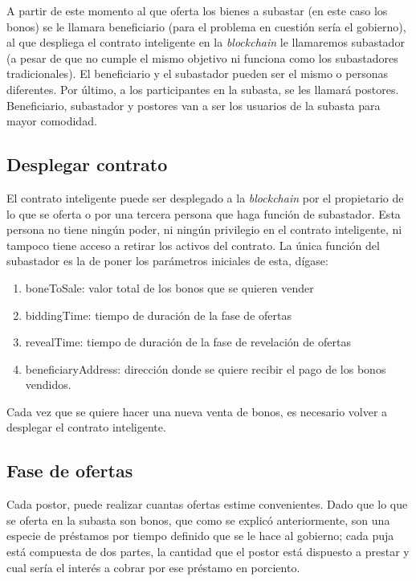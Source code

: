   A partir de este momento al que oferta los bienes a subastar (en este caso los bonos) se le llamara 
  beneficiario (para el problema en cuestión sería el gobierno), al que despliega el contrato inteligente en la \textit{blockchain} le llamaremos 
  subastador (a pesar de que no cumple el mismo objetivo ni funciona como los subastadores tradicionales). El beneficiario y el 
  subastador pueden ser el mismo o personas diferentes. Por último, a los participantes en la subasta, se les llamará postores. 
  Beneficiario, subastador y postores van a ser los usuarios de la subasta para mayor comodidad.

  \subsection{Desplegar contrato}
    El contrato inteligente puede ser desplegado a la \textit{blockchain} por el propietario de lo que se oferta
    o por una tercera persona que haga función de subastador. Esta persona no tiene ningún poder, ni ningún
    privilegio en el contrato inteligente, ni tampoco tiene acceso a retirar los activos del contrato. La única función del subastador 
    es la de poner los parámetros iniciales de esta, dígase: 
  
    \begin{enumerate}
      \item boneToSale: valor total de los bonos que se quieren vender
      \item biddingTime: tiempo de duración de la fase de ofertas
      \item revealTime: tiempo de duración de la fase de revelación de ofertas
      \item beneficiaryAddress: dirección donde se quiere recibir el pago de los bonos vendidos.
    \end{enumerate}

    Cada vez que se quiere hacer una nueva venta de bonos, es necesario volver a desplegar el contrato inteligente.

  \subsection{Fase de ofertas}
    Cada postor, puede realizar cuantas ofertas estime convenientes. Dado que lo que se oferta en la subasta son 
    bonos, que como se explicó anteriormente, son una especie de préstamos por tiempo definido que se le hace al gobierno; cada puja está
    compuesta de dos partes, la cantidad que el postor está dispuesto a prestar y cual sería el interés a cobrar por ese préstamo en 
    porciento. 

